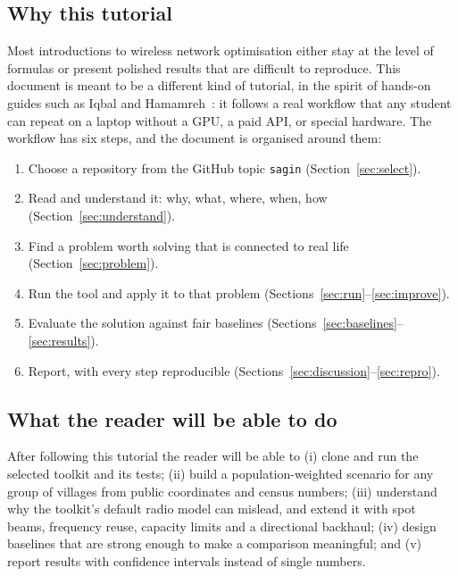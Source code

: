 \documentclass[11pt,a4paper]{article}
\begin{document}
\subsection{Why this tutorial}
Most introductions to wireless network optimisation either stay at the level of formulas or present polished results that are difficult to reproduce. This document is meant to be a different kind of tutorial, in the spirit of hands-on guides such as Iqbal and Hamamreh~\cite{iqbal2021tutorial}: it follows a real workflow that any student can repeat on a laptop without a GPU, a paid API, or special hardware. The workflow has six steps, and the document is organised around them:
\begin{enumerate}[label=\textbf{Step \arabic*.}, leftmargin=*, labelsep=0.6em]
  \item Choose a repository from the GitHub topic \texttt{sagin} (Section~\ref{sec:select}).
  \item Read and understand it: why, what, where, when, how (Section~\ref{sec:understand}).
  \item Find a problem worth solving that is connected to real life (Section~\ref{sec:problem}).
  \item Run the tool and apply it to that problem (Sections~\ref{sec:run}--\ref{sec:improve}).
  \item Evaluate the solution against fair baselines (Sections~\ref{sec:baselines}--\ref{sec:results}).
  \item Report, with every step reproducible (Sections~\ref{sec:discussion}--\ref{sec:repro}).
\end{enumerate}

\subsection{What the reader will be able to do}
After following this tutorial the reader will be able to (i) clone and run the selected toolkit and its tests; (ii) build a population-weighted scenario for any group of villages from public coordinates and census numbers; (iii) understand why the toolkit's default radio model can mislead, and extend it with spot beams, frequency reuse, capacity limits and a directional backhaul; (iv) design baselines that are strong enough to make a comparison meaningful; and (v) report results with confidence intervals instead of single numbers.
\end{document}
